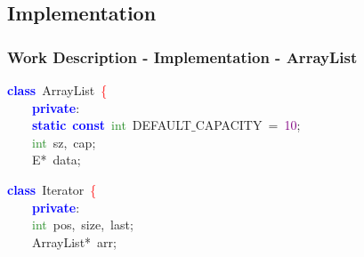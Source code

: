 \documentclass[table, usenames,dvipsnames,svgnames]{beamer}
\begin{document}
\subsection{Implementation}

\begin{frame}

\frametitle{Work Description - Implementation - ArrayList}




\pause
\vspace{-2mm}
\begin{center}\begin{minipage}{90mm}
\begin{block}
\noindent
\mbox{}\textbf{\textcolor{Blue}{class}}\ \textcolor{TealBlue}{ArrayList}\ \textcolor{Red}{\{} \\
\mbox{}\ \ \ \ \textbf{\textcolor{Blue}{private}}\textcolor{BrickRed}{:} \\
\mbox{}\ \ \ \ \textbf{\textcolor{Blue}{static}}\ \textbf{\textcolor{Blue}{const}}\ \textcolor{ForestGreen}{int}\ DEFAULT$\_$CAPACITY\ \textcolor{BrickRed}{=}\ \textcolor{Purple}{10}\textcolor{BrickRed}{;} \\
\mbox{}\ \ \ \ \textcolor{ForestGreen}{int}\ sz\textcolor{BrickRed}{,}\ cap\textcolor{BrickRed}{;} \\
\mbox{}\ \ \ \ E\textcolor{BrickRed}{*}\ data\textcolor{BrickRed}{;} 

\end{block}
\end{minipage}\end{center}

\pause
\vspace{-4mm}
\begin{center}\begin{minipage}{90mm}
\begin{block}
\noindent
\mbox{}\textbf{\textcolor{Blue}{class}}\ \textcolor{TealBlue}{Iterator}\ \textcolor{Red}{\{} \\
\mbox{}\ \ \ \ \textbf{\textcolor{Blue}{private}}\textcolor{BrickRed}{:} \\
\mbox{}\ \ \ \ \textcolor{ForestGreen}{int}\ pos\textcolor{BrickRed}{,}\ size\textcolor{BrickRed}{,}\ last\textcolor{BrickRed}{;} \\
\mbox{}\ \ \ \ ArrayList\textcolor{BrickRed}{*}\ arr\textcolor{BrickRed}{;}
\end{block}
\end{minipage}\end{center}


\end{frame}
\end{document}

